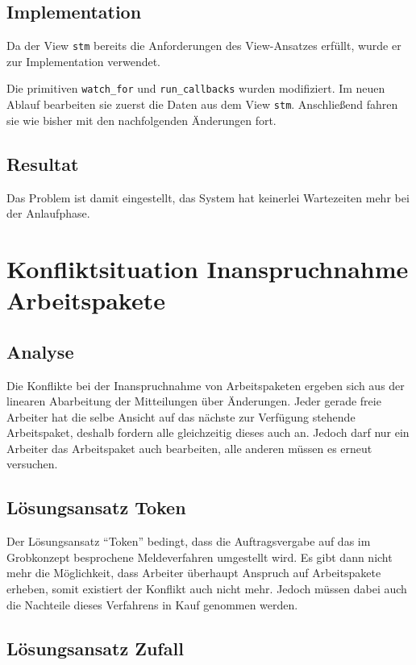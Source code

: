 \subsection{Implementation}
Da der View \verb|stm| bereits die Anforderungen des View-Ansatzes erfüllt,
wurde er zur Implementation verwendet.

Die primitiven \verb|watch_for| und \verb|run_callbacks| wurden modifiziert.
Im neuen Ablauf bearbeiten sie zuerst die Daten aus dem View \verb|stm|.
Anschließend fahren sie wie bisher mit den nachfolgenden Änderungen fort.

\subsection{Resultat}
Das Problem ist damit eingestellt, das System hat keinerlei Wartezeiten mehr bei der Anlaufphase.


\section{Konfliktsituation Inanspruchnahme Arbeitspakete}
\label{cha:opt:conflict-claim}
\subsection{Analyse}
Die Konflikte bei der Inanspruchnahme von Arbeitspaketen ergeben sich aus der linearen Abarbeitung der Mitteilungen über Änderungen.
Jeder gerade freie Arbeiter hat die selbe Ansicht auf das nächste zur Verfügung stehende Arbeitspaket, deshalb fordern alle gleichzeitig dieses auch an.
Jedoch darf nur ein Arbeiter das Arbeitspaket auch bearbeiten,
alle anderen müssen es erneut versuchen.

\subsection{Lösungsansatz Token}
Der Lösungsansatz ``Token'' bedingt, dass die Auftragsvergabe auf das im Grobkonzept besprochene Meldeverfahren umgestellt wird.
Es gibt dann nicht mehr die Möglichkeit, dass Arbeiter überhaupt Anspruch auf Arbeitspakete erheben, somit existiert der Konflikt auch nicht mehr.
Jedoch müssen dabei auch die Nachteile dieses Verfahrens in Kauf genommen werden.

\subsection{Lösungsansatz Zufall}

